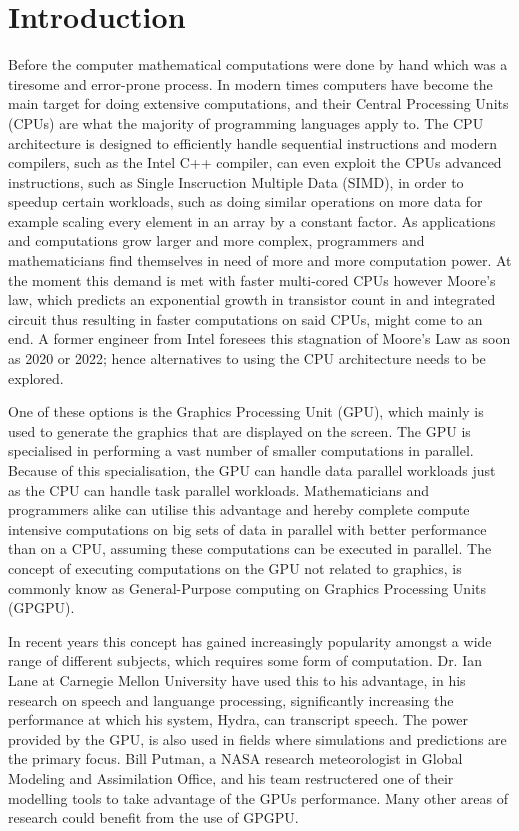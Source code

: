\chapter{Introduction} %
\label{cha:introduction}
Before the computer mathematical computations were done by hand which was a tiresome and error-prone process.
In modern times computers have become the main target for doing extensive computations, and their Central Processing Units (CPUs) are what the majority of programming languages apply to.
The CPU architecture is designed to efficiently handle sequential instructions and modern compilers, such as the Intel C++ compiler, can even exploit the CPUs advanced instructions, such as Single Inscruction Multiple Data (SIMD), in order to speedup certain workloads, such as doing similar operations on more data for example scaling every element in an array by a constant factor. \citep{INTEL_SIMD}
As applications and computations grow larger and more complex, programmers and mathematicians find themselves in need of more and more computation power. \citep[pp. 4]{OpenCL_AMD}
At the moment this demand is met with faster multi-cored CPUs however Moore's law, which predicts an exponential growth in transistor count in and integrated circuit thus resulting in faster computations on said CPUs, might come to an end.
A former engineer from Intel foresees this stagnation of Moore's Law as soon as 2020 or 2022; hence alternatives to using the CPU architecture needs to be explored. \citep{Moore2013}

One of these options is the Graphics Processing Unit (GPU), which mainly is used to generate the graphics that are displayed on the screen.
The GPU is specialised in performing a vast number of smaller computations in parallel.
Because of this specialisation, the GPU can handle data parallel workloads just as the CPU can handle task parallel workloads.
Mathematicians and programmers alike can utilise this advantage and hereby complete compute intensive computations on big sets of data in parallel with better performance than on a CPU, assuming these computations can be executed in parallel.
The concept of executing computations on the GPU not related to graphics, is commonly know as General-Purpose computing on Graphics Processing Units (GPGPU).

In recent years this concept has gained increasingly popularity amongst a wide range of different subjects, which requires some form of computation.
Dr. Ian Lane at Carnegie Mellon University have used this to his advantage, in his research on speech and languange processing, significantly increasing the performance at which his system, Hydra, can transcript speech. \citep{NvidiaSpotlightIan}
The power provided by the GPU, is also used in fields where simulations and predictions are the primary focus. 
Bill Putman, a NASA research meteorologist in Global Modeling and Assimilation Office, and his team restructered one of their modelling tools to take advantage of the GPUs performance. \citep{NvidiaSpotlightNasa}
Many other areas of research could benefit from the use of GPGPU.

